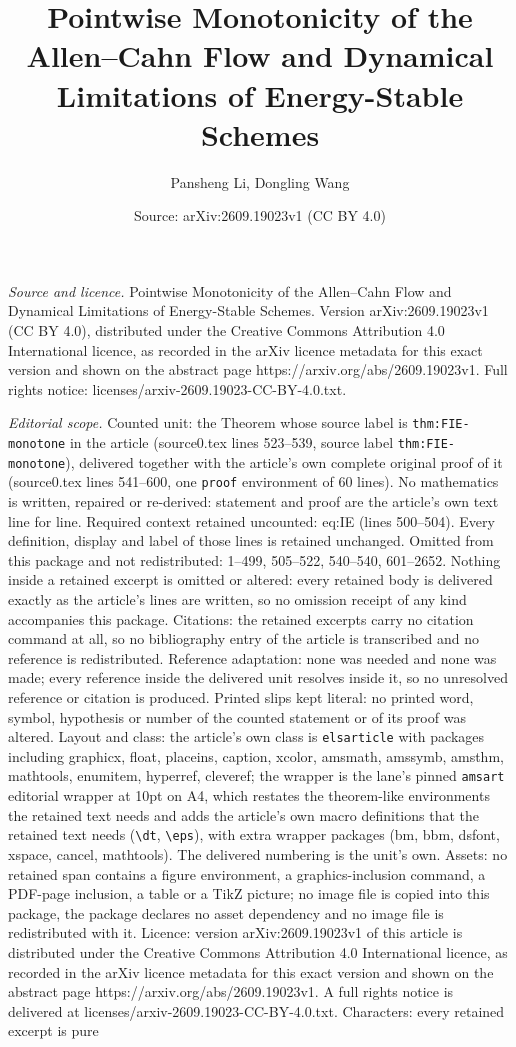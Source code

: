 \documentclass[10pt,a4paper]{amsart}
\title[Pointwise Monotonicity of the Allen--Cahn Flow and Dynamical]{Pointwise Monotonicity of the Allen--Cahn Flow and Dynamical Limitations of Energy-Stable Schemes}
\author{Pansheng Li, Dongling Wang}
\date{Source: arXiv:2609.19023v1 (CC BY 4.0)}
\begin{document}
\maketitle

\noindent\emph{Source and licence.} Pointwise Monotonicity of the Allen--Cahn Flow and Dynamical Limitations of Energy-Stable Schemes. Version arXiv:2609.19023v1 (CC BY 4.0), distributed under the Creative Commons Attribution 4.0 International licence, as recorded in the arXiv licence metadata for this exact version and shown on the abstract page https://arxiv.org/abs/2609.19023v1. Full rights notice: licenses/arxiv-2609.19023-CC-BY-4.0.txt.\par\smallskip

\noindent\textit{Editorial scope.} Counted unit: the Theorem whose source label is \texttt{thm:FIE-monotone} in the article (source0.tex lines 523--539, source label \texttt{thm:FIE-monotone}), delivered together with the article's own complete original proof of it (source0.tex lines 541--600, one \texttt{proof} environment of 60 lines). No mathematics is written, repaired or re-derived: statement and proof are the article's own text line for line. Required context retained uncounted: eq:IE (lines 500--504). Every definition, display and label of those lines is retained unchanged. Omitted from this package and not redistributed: 1--499, 505--522, 540--540, 601--2652. Nothing inside a retained excerpt is omitted or altered: every retained body is delivered exactly as the article's lines are written, so no omission receipt of any kind accompanies this package. Citations: the retained excerpts carry no citation command at all, so no bibliography entry of the article is transcribed and no reference is redistributed. Reference adaptation: none was needed and none was made; every reference inside the delivered unit resolves inside it, so no unresolved reference or citation is produced. Printed slips kept literal: no printed word, symbol, hypothesis or number of the counted statement or of its proof was altered. Layout and class: the article's own class is \texttt{elsarticle} with packages including graphicx, float, placeins, caption, xcolor, amsmath, amssymb, amsthm, mathtools, enumitem, hyperref, cleveref; the wrapper is the lane's pinned \texttt{amsart} editorial wrapper at 10pt on A4, which restates the theorem-like environments the retained text needs and adds the article's own macro definitions that the retained text needs (\texttt{\textbackslash dt}, \texttt{\textbackslash eps}), with extra wrapper packages (bm, bbm, dsfont, xspace, cancel, mathtools). The delivered numbering is the unit's own. Assets: no retained span contains a figure environment, a graphics-inclusion command, a PDF-page inclusion, a table or a TikZ picture; no image file is copied into this package, the package declares no asset dependency and no image file is redistributed with it. Licence: version arXiv:2609.19023v1 of this article is distributed under the Creative Commons Attribution 4.0 International licence, as recorded in the arXiv licence metadata for this exact version and shown on the abstract page https://arxiv.org/abs/2609.19023v1. A full rights notice is delivered at licenses/arxiv-2609.19023-CC-BY-4.0.txt. Characters: every retained excerpt is pure 
\end{document}
